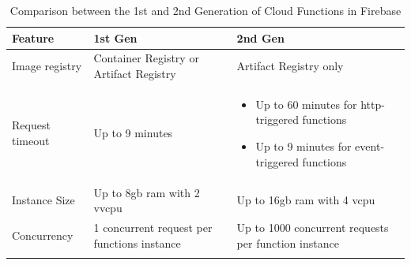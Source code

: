 \begin{longtable}{|p{5cm}|p{5.5cm}|p{5.5cm}|}
      \hline
      \rowcolor{blue!20}
      Feature         & 1st Gen                                                     & 2nd Gen                                                       \\
      \endfirsthead
      \hline
      Image registry  & Container Registry or Artifact Registry                     & Artifact Registry only                                        \\
      \hline
      Request timeout & Up to 9 minutes                                             & \begin{itemize}
                                                                                            \item Up to 60 minutes for \acrshort{http}-triggered functions
                                                                                            \item Up to 9 minutes for event-triggered functions
                                                                                      \end{itemize} \\
      \hline
      Instance Size   & Up to 8\acrshort{gb} \acrshort{ram} with 2 v\acrshort{vcpu} & Up to 16\acrshort{gb} \acrshort{ram} with 4 \acrshort{vcpu}   \\
      \hline
      Concurrency     & 1 concurrent request per functions instance                 & Up to 1000 concurrent requests per function instance          \\
      \hline
      \caption{Comparison between the 1st and 2nd Generation of Cloud Functions in Firebase}
      \label{tab:restvsoap}
\end{longtable}



